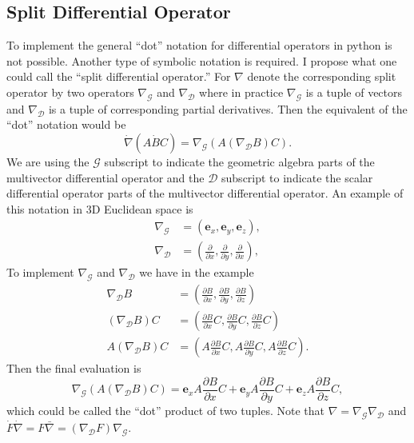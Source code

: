\documentclass[12pt]{report}
\newcommand{\bm}[1]{\boldsymbol{#1}}
\newcommand{\bra}[1]{{#1}_{\mathcal{G}}}
\newcommand{\ket}[1]{{#1}_{\mathcal{D}}}
\newcommand{\bfrac}[2]{\displaystyle\frac{#1}{#2}}
\newcommand{\lp}{\left (}
\newcommand{\rp}{\right )}
\newcommand{\pdiff}[2]{\bfrac{\partial {#1}}{\partial {#2}}}
\newcommand{\paren}[1]{\lp {#1} \rp}
\newcommand{\eb}{\bm{e}}
\begin{document}
\subsection{Split Differential Operator}

To implement the general ``dot'' notation for differential operators in python is not possible.  Another type of symbolic notation is required.  I
propose what one could call the ``split differential operator.''  For $\nabla$ denote the corresponding split operator by two operators 
$\bra{\nabla}$ and
$\ket{\nabla}$ where in practice $\bra{\nabla}$ is a tuple of vectors and $\ket{\nabla}$ is a tuple of corresponding partial derivatives.  Then the equivalent of
the ``dot'' notation would be
\begin{equation}
	\dot{\nabla}\paren{A\dot{B}C} = \bra{\nabla}\paren{A\paren{\ket{\nabla}B}C}.\label{splitopV}
\end{equation}
We are using the $\mathcal{G}$ subscript to indicate the geometric algebra parts of the multivector differential operator and the $\mathcal{D}$ subscript
to indicate the scalar differential operator parts of the multivector differential operator.  An example of this notation in 3D Euclidean space is
\begin{eqnarray}
	\bra{\nabla} &= \paren{\eb_{x},\eb_{y},\eb_{z}}, \\
	\ket{\nabla} &= \paren{\pdiff{}{x},\pdiff{}{y},\pdiff{}{x}},
\end{eqnarray}
To implement $\bra{\nabla}$ and $\ket{\nabla}$ we have in the example
\begin{eqnarray}
	\ket{\nabla}B &= \paren{\pdiff{B}{x},\pdiff{B}{y},\pdiff{B}{z}} \\
	\paren{\ket{\nabla}B}C &= \paren{\pdiff{B}{x}C,\pdiff{B}{y}C,\pdiff{B}{z}C} \\
	A\paren{\ket{\nabla}B}C &= \paren{A\pdiff{B}{x}C,A\pdiff{B}{y}C,A\pdiff{B}{z}C}.
\end{eqnarray}
Then the final evaluation is
\begin{equation}
	\bra{\nabla}\paren{A\paren{\ket{\nabla}B}C} = \eb_{x}A\pdiff{B}{x}C+\eb_{y}A\pdiff{B}{y}C+\eb_{z}A\pdiff{B}{z}C,
\end{equation}
which could be called the ``dot'' product of two tuples.  Note that $\nabla = \bra{\nabla}\ket{\nabla}$ and 
$\dot{F}\dot{\nabla} = F\bar{\nabla} = \paren{\ket{\nabla}F}\bra{\nabla}$.
\end{document}
